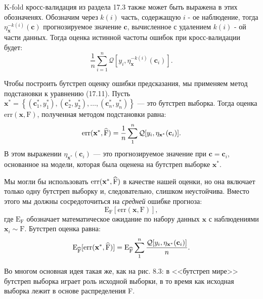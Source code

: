 K-fold кросс-валидация из раздела 17.3 также может быть выражена в этих обозначенях. Обозначим через $k(i)$ часть, содержащую $i$ - ое наблюдение, тогда $\eta_{\textbf{x}}^{-k(i)}(\textbf{c})$ прогнозируемое значение $\textbf{c}$, вычисленное с удалением $k (i)$ - ой части данных. Тогда оценка истинной частоты ошибок при кросс-валидации будет:
\begin{equation}
\frac{1}{n} \sum_{i = 1}^{n} \mathcal{Q} [y_{i}, \eta_{\textbf{x}} ^{-k(i)}(\textbf{c}_{i})].
\end{equation}

Чтобы построить бутстреп оценку ошибки предсказания, мы применяем метод подстановки к уравнению (17.11). Пусть $\textbf{x}^{*} = \left \{  (\textbf{c}^{*}_{1}, y^{*}_{1}), (\textbf{c}^{*}_{2}, y^{*}_{2}),\ldots,(\textbf{c}^{*}_{n}, y^{*}_{n})\right \}$ --- это
бутстреп выборка. Тогда оценка $\text{err}(\textbf{x}, \text{F})$, полученная методом подстановки равна:
\begin{equation}
\text{err}(\textbf{x}^{*}, \widehat{\text{F}})= \frac{1}{n} \sum^{n}_{1} \mathcal{Q}[y_{i},  \eta_{\textbf{x}^{*}}(\textbf{c}_{i})].
\end{equation}
В этом выражении $\eta_{\textbf{x}^{*}}(\textbf{c}_{i})$ --- это прогнозируемое значение при $\textbf{c} = \textbf{c}_{i}$, основанное на модели, которая была оценена на бутстреп выборке $\textbf{x}^{*}$.

Мы могли бы использовать $\text{err}(\textbf{x}^{*}, \widehat{\text{F}})$ в качестве нашей оценки, но она включает только одну бутстреп выборку и, следовательно, слишком неустойчива. Вместо этого мы должны сосредоточиться на \textit{средней} ошибке прогноза:
\begin{equation}
\mathrm{E}_{\text{F}}[\text{err}(\textbf{x}, \text{F})],
\end{equation}
где $\mathrm{E}_{\text{F}}$ обозначает математическое ожидание по набору данных $\mathbf{x}$ с наблюдениями $\mathbf{x}_{i} \sim \text{F}$. Бутстреп оценка равна:
\begin{equation}
\mathrm{E}_{\widehat{\text{F}}}[\text{err}(\textbf{x}^{*}, \widehat{\text{F}})] = \mathrm{E}_{\widehat{\text{F}}} \sum_{1}^{n} \frac{  \mathcal{Q}[y_{i},  \eta_{\textbf{x}^{*}}(\textbf{c}_{i})]}{n}.
\end{equation}


Во многом основная идея такая же, как на рис. 8.3: в <<бутстреп мире>> бутстреп выборка играет роль исходной выборки, в то время как исходная выборка лежит в основе распределения F.

